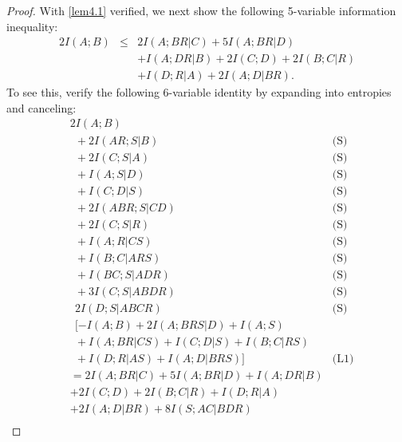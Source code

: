 \documentclass[10pt,journal]{IEEEtran}
\begin{document}
\begin{proof}
With \eqref{lem4.1} verified, we next show the following 5-variable information inequality:
\begin{eqnarray}\label{lem4.2}
   2I(A;B) &\le& 2I(A;BR|C)+5I(A;BR|D) \nonumber\\
      && +I(A;DR|B)+2I(C;D)+2I(B;C|R)\nonumber\\
      && +I(D;R|A)+2I(A;D|BR).
\end{eqnarray}
To see this, verify the following 6-variable identity by expanding into entropies
and canceling:
\begin{align*}
&2I(A;B)&\\
      &\ \  + 2I(AR;S|B)                                                       & \text{(S)} \\
      &\ \  + 2I(C;S|A)                                                         & \text{(S)} \\
      &\ \  + I(A;S|D)                                                          & \text{(S)} \\
      &\ \  + I(C;D|S)                                                       & \text{(S)} \\
      &\ \  + 2I(ABR;S|CD)                                                    & \text{(S)} \\
      &\ \  + 2I(C;S|R)                                                        & \text{(S)} \\
      &\ \  + I(A;R|CS)                                                       & \text{(S)} \\
      &\ \  + I(B;C|ARS)                                                       & \text{(S)} \\
      &\ \  + I(BC;S|ADR)                                                         & \text{(S)} \\
      &\ \  + 3I(C;S|ABDR)                                                       & \text{(S)} \\
      &\ \  2I(D;S|ABCR)                                                      & \text{(S)} \\
      &\ \  [-I(A;B)+2I(A;BRS|D)+I(A;S) \\
      &\ \  +I(A;BR|CS)+I(C;D|S)+I(B;C|RS) \\
      &\ \  +I(D;R|AS)+I(A;D|BRS)]                                              & \text{(L1)} \\
      & = 2I(A;BR|C)+5I(A;BR|D)+I(A;DR|B)&\\
      & +2I(C;D)+2I(B;C|R)+I(D;R|A) &\\
      & +2I(A;D|BR) + 8I(S;AC|BDR) &\\

\end{align*}
\end{proof}
\end{document}
